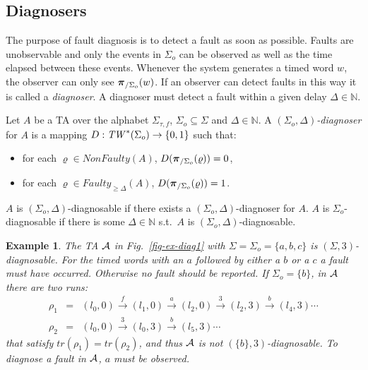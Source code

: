 \documentclass[letterpaper,10pt,conference]{ieeeconf}  \IEEEoverridecommandlockouts                              \overrideIEEEmargins
\def\st{{s.t.}~}
\def\trace{\textit{tr}}
\def\faulty{\textit{Faulty}}
\def\nonfaulty{\textit{NonFaulty}}
\newtheorem{example}{Example}
\newcommand{\setN}{\mathbb N}
\def\calA{{\cal A}}
\def\endef{\ifmmode\squareforged\else{\unskip\nobreak\hfil
\penalty50\hskip1em\null\nobreak\hfil$\blacksquare$
\parfillskip=0pt\finalhyphendemerits=0\endgraf}\fi}
\def\endex{\ifmmode\squareforged\else{\unskip\nobreak\hfil
\penalty50\hskip1em\null\nobreak\hfil$\square$
\parfillskip=0pt\finalhyphendemerits=0\endgraf}\fi}
\def\tauac{\tau}
\def\tw{\textit{TW\/}}
\begin{document}
\subsection{Diagnosers}
The purpose of fault diagnosis is to detect a fault as soon as
possible.  Faults are unobservable and only the events in $\Sigma_o$
can be observed as well as the time elapsed between these events.
Whenever the system generates a timed word $w$, the observer can only
see $\boldsymbol{\pi}_{/\Sigma_o}(w)$.  If an observer can detect faults in this
way it is called a \emph{diagnoser}.  A diagnoser must detect a fault
within a given delay $\Delta \in \setN$.

\begin{definition}\label{def-diag}
  Let $A$ be a TA over the alphabet $\Sigma_{\tauac,f}$, $\Sigma_o
  \subseteq \Sigma$ and $\Delta \in \setN$.  A
  \emph{$(\Sigma_o,\Delta)$-diagnoser} for $A$ is a mapping $D:
  \tw^*(\Sigma_o)\rightarrow \{0,1\}$ such that:
  \begin{itemize}
  \item for each $\varrho \in \nonfaulty(A)$,
    $D(\boldsymbol{\pi}_{/\Sigma_o}(\varrho))=0$,
  \item for each $\varrho \in \faulty_{\geq \Delta}(A)$,
    $D(\boldsymbol{\pi}_{/\Sigma_o}(\varrho))=1$. \endef
  \end{itemize}
\end{definition}
$A$ is $(\Sigma_o,\Delta)$-diagnosable if there exists a
$(\Sigma_o,\Delta)$-diagnoser for $A$. $A$ is $\Sigma_o$-diagnosable
if there is some $\Delta \in \setN$ \st $A$ is
$(\Sigma_o,\Delta)$-diagnosable.

\begin{example}
  The TA $\calA$ in Fig.~\ref{fig-ex-diag1} with
  $\Sigma=\Sigma_o=\{a,b,c\}$ is $(\Sigma,3)$-diagnosable.  For the
  timed words with an $a$ followed by either a $b$ or a $c$ a fault
  must have occurred.  Otherwise no fault should be reported.
If $\Sigma_o=\{b\}$, in $\calA$ there are two runs:
  \begin{eqnarray*}
    \rho_1 \!\!\!  & = & \!\!\! (l_0,0) \xrightarrow{\; f \; } (l_1,0) 
    \xrightarrow{\; a \; } (l_2,0) 
    \xrightarrow{\; 3 \; } (l_2,3) 
    \xrightarrow{\; b\; } (l_4,3) \cdots  \\
\rho_2 \!\!\! & = & \!\!\! (l_0,0) 
    \xrightarrow{3} (l_0,3) \xrightarrow{\ b \ } (l_5,3) \cdots  
\end{eqnarray*}
  that satisfy $\trace(\rho_1)=\trace(\rho_2)$, and thus $\calA$ is
  not $(\{b\},3)$-dia\-gnosable. To diagnose a fault in $\calA$, $a$
  must be observed. \endex
\end{example}
\end{document}

